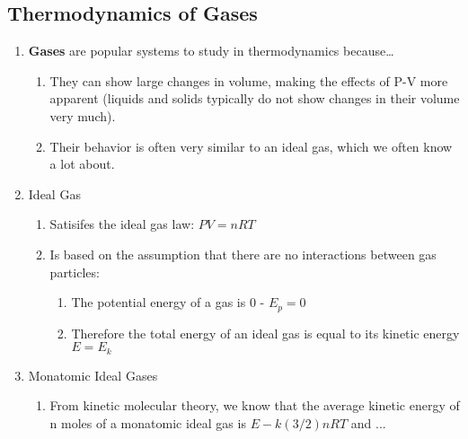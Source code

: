 \documentclass[../CHEM152Notes.tex]{subfiles}
\begin{document}
\subsection*{Thermodynamics of Gases}
\begin{enumerate}
    \item \textbf{Gases} are popular systems to study in thermodynamics because\dots
        \begin{enumerate}
            \item They can show large changes in volume, making the effects of P-V more apparent (liquids and solids typically do not show changes in their volume very much).
            \item Their behavior is often very similar to an ideal gas, which we often know a lot about.
        \end{enumerate}
    \item Ideal Gas
        \begin{enumerate}
            \item Satisifes the ideal gas law: $PV=nRT$
            \item Is based on the assumption that there are no interactions between gas particles:
                \begin{enumerate}
                    \item The potential energy of a gas is 0 - $E_p = 0$
                    \item Therefore the total energy of an ideal gas is equal to its kinetic energy $E = E_k$
                \end{enumerate}
        \end{enumerate}
    \item Monatomic Ideal Gases
        \begin{enumerate}
            \item From kinetic molecular theory, we know that the average kinetic energy of n moles of a monatomic ideal gas is $E-k (3/2)nRT$ and ... %
        \end{enumerate}
\end{enumerate}
\end{document}
